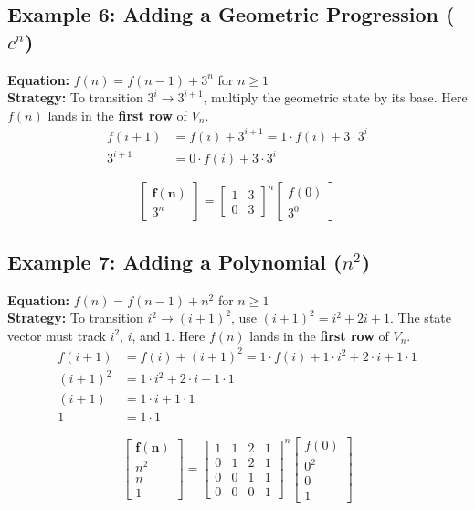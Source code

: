 \documentclass[11pt]{article}
\begin{document}
\subsection{Example 6: Adding a Geometric Progression ($c^n$)}
\textbf{Equation:} $f(n) = f(n-1) + 3^n$ for $n \ge 1$ \\
\textbf{Strategy:} To transition $3^i \to 3^{i+1}$, multiply the geometric state by its base. Here $f(n)$ lands in the \textbf{first row} of $V_n$.
\begin{align*}
    f(i+1) &= f(i) + 3^{i+1} = 1 \cdot f(i) + 3 \cdot 3^i \\
    3^{i+1} &= 0 \cdot f(i) + 3 \cdot 3^i
\end{align*}

\[
\begin{bmatrix} \mathbf{f(n)} \\ 3^n \end{bmatrix} = 
\begin{bmatrix} 1 & 3 \\ 0 & 3 \end{bmatrix}^n 
\begin{bmatrix} f(0) \\ 3^0 \end{bmatrix}
\]

\subsection{Example 7: Adding a Polynomial ($n^2$)}
\textbf{Equation:} $f(n) = f(n-1) + n^2$ for $n \ge 1$ \\
\textbf{Strategy:} To transition $i^2 \to (i+1)^2$, use $(i+1)^2 = i^2 + 2i + 1$. The state vector must track $i^2$, $i$, and $1$. Here $f(n)$ lands in the \textbf{first row} of $V_n$.
\begin{align*}
    f(i+1) &= f(i) + (i+1)^2 = 1 \cdot f(i) + 1 \cdot i^2 + 2 \cdot i + 1 \cdot 1 \\
    (i+1)^2 &= 1 \cdot i^2 + 2 \cdot i + 1 \cdot 1 \\
    (i+1) &= 1 \cdot i + 1 \cdot 1 \\
    1 &= 1 \cdot 1
\end{align*}

\[
\begin{bmatrix} \mathbf{f(n)} \\ n^2 \\ n \\ 1 \end{bmatrix} = 
\begin{bmatrix} 
1 & 1 & 2 & 1 \\ 
0 & 1 & 2 & 1 \\ 
0 & 0 & 1 & 1 \\ 
0 & 0 & 0 & 1 
\end{bmatrix}^n 
\begin{bmatrix} f(0) \\ 0^2 \\ 0 \\ 1 \end{bmatrix}
\]
\end{document}
